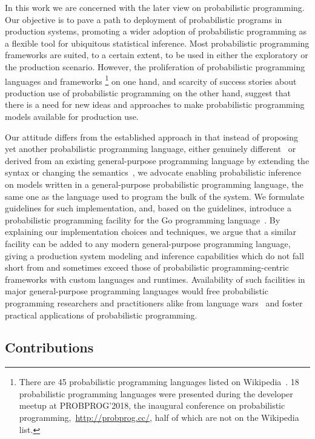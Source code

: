 \documentclass[sigplan,screen]{acmart}
\begin{document}
\begin{sloppypar}
  In this work we are concerned with the later view on
  probabilistic programming. Our objective is to pave a path
  to deployment of probabilistic programs in production
  systems, promoting a wider adoption of probabilistic
  programming as a flexible tool for ubiquitous statistical
  inference. Most probabilistic programming frameworks are
  suited, to a certain extent, to be used in either the
  exploratory or the production scenario. However, the
  proliferation of probabilistic programming languages and
  frameworks \footnote{There are 45 probabilistic programming
  languages listed on
  Wikipedia~\cite{wiki:Probabilistic_programming_language}. 18
  probabilistic programming languages were presented during
  the developer meetup at PROBPROG'2018, the inaugural
  conference on probabilistic
  programming,~\url{http://probprog.cc/}, half of which are
  not on the Wikipedia list.} on one hand, and scarcity of success
  stories about production use of probabilistic programming on
  the other hand, suggest that there is a need for new ideas
  and approaches to make probabilistic programming models
  available for production use.

  Our attitude differs from the established approach in that
  instead of proposing yet another probabilistic programming
  language, either genuinely different~\cite{MMR+07,Stan17} or
  derived from an existing general-purpose programming
  language by extending the syntax or changing the
  semantics~\cite{GMR+08,TMY+16,GXG18}, we advocate enabling
  probabilistic inference on models written in a
  general-purpose probabilistic programming language, the same
  one as the language used to program the bulk of the system.
  We formulate guidelines for such implementation, and, based
  on the guidelines, introduce a probabilistic programming
  facility for the Go programming language~\cite{Golang}. By
  explaining our implementation choices and techniques,
  we argue that a similar facility can be added to any modern
  general-purpose programming language, giving a
  production system modeling and inference capabilities which
  do not fall short from and sometimes exceed those of
  probabilistic programming-centric frameworks with custom
  languages and runtimes. Availability of such facilities
  in major general-purpose programming languages would free
  probabilistic programming researchers and practitioners
  alike from language wars~\cite{SH14} and foster practical
  applications of probabilistic programming.

  \subsection*{Contributions}


\end{sloppypar}
\end{document}
